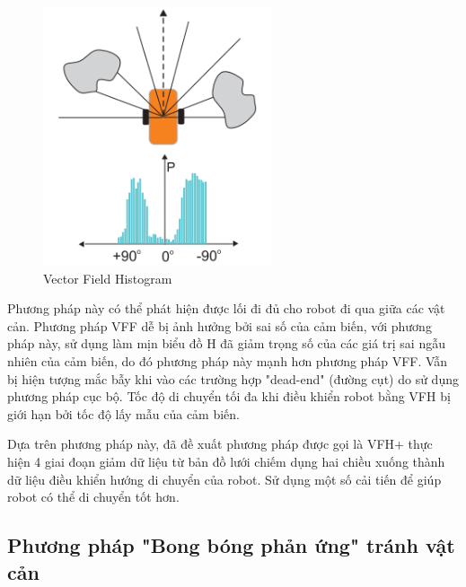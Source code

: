\begin{figure}[htbp]
  \centering
  \includegraphics[width=0.6\textwidth]{figures/VFH.png}
  \caption{Vector Field Histogram \cite{Susnea2009}}
  \label{fig:VFH}
\end{figure}

Phương pháp này có thể phát hiện được lối đi đủ cho robot đi qua giữa các vật cản.  Phương pháp VFF dễ bị ảnh hưởng bởi sai số của cảm biến, với phương pháp này, sử dụng làm mịn biểu đồ H đã giảm trọng số của các giá trị sai ngẫu nhiên của cảm biến, do đó phương pháp này mạnh hơn phương pháp VFF. Vẫn bị hiện tượng mắc bẫy khi vào các trường hợp "dead-end" (đường cụt) do sử dụng phương pháp cục bộ. Tốc độ di chuyển tối đa khi điều khiển robot bằng VFH bị giới hạn bởi tốc độ lấy mẫu của cảm biến.

Dựa trên phương pháp này, \cite{Ulrich1998} đã đề xuất phương pháp được gọi là VFH+ thực hiện 4 giai đoạn giảm dữ liệu từ bản đồ lưới chiếm dụng hai chiều xuống thành dữ liệu điều khiển hướng di chuyển của robot. Sử dụng một số cải tiến để giúp robot có thể di chuyển tốt hơn.

\subsection{Phương pháp "Bong bóng phản ứng" tránh vật cản}


